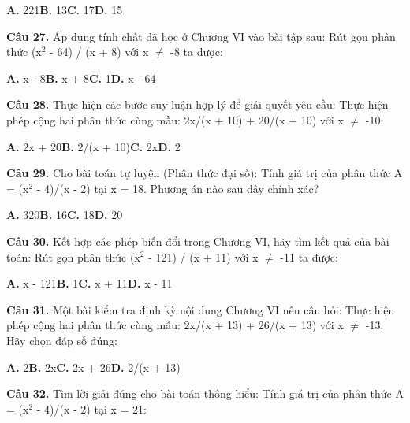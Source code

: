 \documentclass[11pt,a4paper]{article}
\begin{document}
\hspace*{1.5em}\textbf{A.} 221\quad\quad \textbf{B.} 13\quad\quad \textbf{C.} 17\quad\quad \textbf{D.} 15\par\vspace{2pt}
\textbf{\color{primary} Câu 27.} Áp dụng tính chất đã học ở Chương VI vào bài tập sau: Rút gọn phân thức (x$^2$ - 64) / (x + 8) với x $\ne$ -8 ta được:\par
\hspace*{1.5em}\textbf{A.} x - 8\quad\quad \textbf{B.} x + 8\quad\quad \textbf{C.} 1\quad\quad \textbf{D.} x - 64\par\vspace{2pt}
\textbf{\color{primary} Câu 28.} Thực hiện các bước suy luận hợp lý để giải quyết yêu cầu: Thực hiện phép cộng hai phân thức cùng mẫu: 2x/(x + 10) + 20/(x + 10) với x $\ne$ -10:\par
\hspace*{1.5em}\textbf{A.} 2x + 20\quad\quad \textbf{B.} 2/(x + 10)\quad\quad \textbf{C.} 2x\quad\quad \textbf{D.} 2\par\vspace{2pt}
\textbf{\color{primary} Câu 29.} Cho bài toán tự luyện (Phân thức đại số): Tính giá trị của phân thức A = (x$^2$ - 4)/(x - 2) tại x = 18. Phương án nào sau đây chính xác?\par
\hspace*{1.5em}\textbf{A.} 320\quad\quad \textbf{B.} 16\quad\quad \textbf{C.} 18\quad\quad \textbf{D.} 20\par\vspace{2pt}
\textbf{\color{primary} Câu 30.} Kết hợp các phép biến đổi trong Chương VI, hãy tìm kết quả của bài toán: Rút gọn phân thức (x$^2$ - 121) / (x + 11) với x $\ne$ -11 ta được:\par
\hspace*{1.5em}\textbf{A.} x - 121\quad\quad \textbf{B.} 1\quad\quad \textbf{C.} x + 11\quad\quad \textbf{D.} x - 11\par\vspace{2pt}
\textbf{\color{primary} Câu 31.} Một bài kiểm tra định kỳ nội dung Chương VI nêu câu hỏi: Thực hiện phép cộng hai phân thức cùng mẫu: 2x/(x + 13) + 26/(x + 13) với x $\ne$ -13. Hãy chọn đáp số đúng:\par
\hspace*{1.5em}\textbf{A.} 2\quad\quad \textbf{B.} 2x\quad\quad \textbf{C.} 2x + 26\quad\quad \textbf{D.} 2/(x + 13)\par\vspace{2pt}
\textbf{\color{primary} Câu 32.} Tìm lời giải đúng cho bài toán thông hiểu: Tính giá trị của phân thức A = (x$^2$ - 4)/(x - 2) tại x = 21:\par
\end{document}
